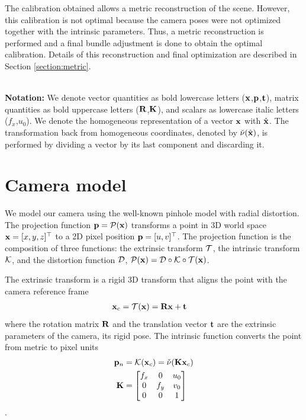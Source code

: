 \documentclass[10pt,twocolumn,letterpaper]{article}
\begin{document}
The calibration obtained allows a metric reconstruction of the scene. However, this calibration is not optimal because the camera poses were not optimized together with the intrinsic parameters. Thus, a metric reconstruction is performed and a final bundle adjustment is done to obtain the optimal calibration. Details of this reconstruction and final optimization are described in Section \ref{section:metric}.


~\\ \noindent\textbf{Notation:}
We denote vector quantities as bold lowercase letters (\eg $\mathbf{x}$,$\mathbf{p}$,$\mathbf{t}$), matrix quantities as bold uppercase letters (\eg $\mathbf{R}$,$\mathbf{K}$), and scalars as lowercase italic letters (\eg $f_x$,$u_0$). We denote the homogeneous representation of a vector $\mathbf{x}$ with $\hat{\mathbf{x}}$. The transformation back from homogeneous coordinates, denoted by $\check{\nu}(\hat{\mathbf{x}})$, is performed by dividing a vector by its last component and discarding it. 


\section{Camera model}
\label{sec:camera}

We model our camera using the well-known pinhole model with radial distortion. The projection function $\mathbf{p}=\mathcal{P}(\mathbf{x})$ transforms a point in 3D world space $\mathbf{x}=[x,y,z]^\top$ to a 2D pixel position $\mathbf{p}=[u,v]^\top$. The projection function is the composition of three functions: the extrinsic transform $\mathcal{T}$, the intrinsic transform $\mathcal{K}$, and the distortion function $\mathcal{D}$, \ie $\mathcal{P}(\mathbf{x}) = \mathcal{D} \circ \mathcal{K} \circ \mathcal{T}(\mathbf{x})$.

The extrinsic transform is a rigid 3D transform that aligns the point with the camera reference frame
%
\begin{align}
\mathbf{x}_c &= \mathcal{T}(\mathbf{x}) = \mathbf{R} \mathbf{x} + \mathbf{t} 
\end{align}
%
where the rotation matrix $\mathbf{R}$ and the translation vector $\mathbf{t}$ are the extrinsic parameters of the camera, \ie its rigid pose. The intrinsic function converts the point from metric to pixel units
%
\begin{align}
\mathbf{p}_n &= \mathcal{K}(\mathbf{x}_c) = \check{\nu}(\mathbf{K} \mathbf{x}_c)
\\
\mathbf{K} &= \begin{bmatrix}
f_x & 0 & u_0 \\
0 & f_y & v_0 \\
0 & 0 & 1
\end{bmatrix}
\label{eq:intrinsic_matrix}
\end{align}.
%
\end{document}
